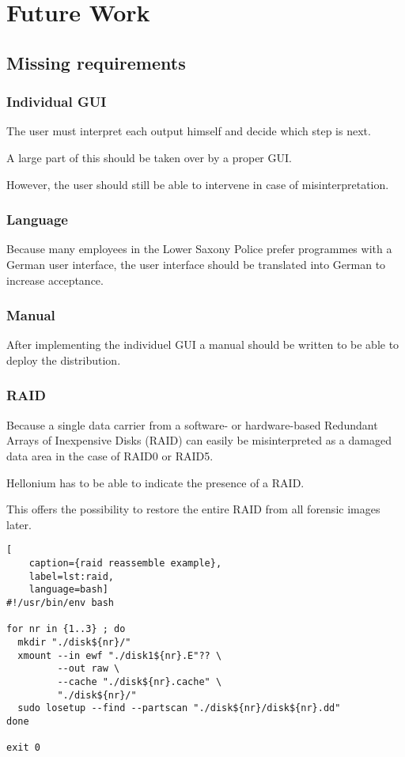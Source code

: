 \chapter{Future Work}
\label{chap:future}

\section{Missing requirements}
\label{sec:missing}

\subsection{Individual GUI}

The user must interpret each output himself and decide which step is next.

A large part of this should be taken over by a proper GUI.

However, the user should still be able to intervene in case of misinterpretation.

\subsection{Language}

Because many employees in the Lower Saxony Police prefer programmes with a German user interface, the user interface should be translated into German to increase acceptance.

\subsection{Manual}

After implementing the individuel GUI a manual should be written to be able to deploy the distribution.

\subsection{RAID}

Because a single data carrier from a software- or hardware-based Redundant Arrays of Inexpensive Disks (RAID) can easily be misinterpreted as a damaged data area in the case of RAID0 or RAID5. \cite{Patterson1988}

Hellonium has to be able to indicate the presence of a RAID.

This offers the possibility to restore the entire RAID from all forensic images later.

\begin{lstlisting}[
    caption={raid reassemble example},
    label=lst:raid,
    language=bash]
#!/usr/bin/env bash

for nr in {1..3} ; do
  mkdir "./disk${nr}/"
  xmount --in ewf "./disk1${nr}.E"?? \
         --out raw \
         --cache "./disk${nr}.cache" \
         "./disk${nr}/"
  sudo losetup --find --partscan "./disk${nr}/disk${nr}.dd"
done

exit 0
\end{lstlisting}

